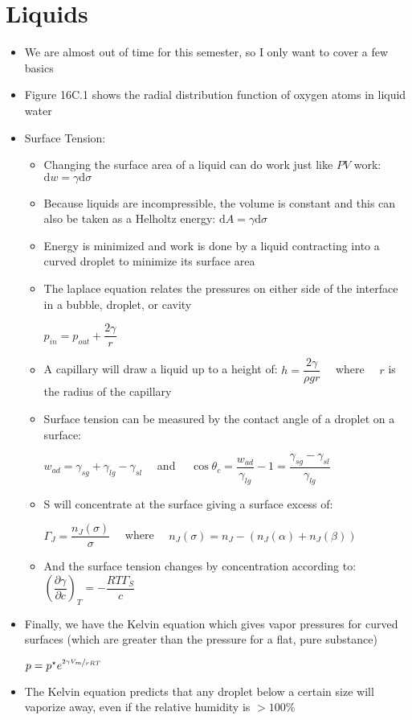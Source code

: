 \documentclass[12pt, openany, letterpaper]{memoir}
\begin{document}
\section{Liquids}
\begin{itemize}
	\item We are almost out of time for this semester, so I only want to cover a few basics
	\item Figure 16C.1 shows the radial distribution function of oxygen atoms in liquid water
	\item Surface Tension:
	\begin{itemize}
		\item Changing the surface area of a liquid can do work just like $PV$ work: $\mathrm{d}w = \gamma\mathrm{d}\sigma$
		\item Because liquids are incompressible, the volume is constant and this can also be taken as a Helholtz energy: $\mathrm{d}A = \gamma\mathrm{d}\sigma$
		\item Energy is minimized and work is done by a liquid contracting into a curved droplet to minimize its surface area
		\item The laplace equation relates the pressures on either side of the interface in a bubble, droplet, or cavity
		
		$p_{in}=p_{out}+\dfrac{2\gamma}{r}$
		\item A capillary will draw a liquid up to a height of: $h=\dfrac{2\gamma}{\rho gr}$ ~~where~~ $r$ is the radius of the capillary
		\item Surface tension can be measured by the contact angle of a droplet on a surface:
		
		$w_{ad}=\gamma_{sg}+\gamma_{lg}-\gamma_{sl}$ ~~and~~ $\cos\theta_c=\dfrac{w_{ad}}{\gamma_{lg}}-1=\dfrac{\gamma_{sg}-\gamma_{sl}}{\gamma_{lg}}$
		\item S will concentrate at the surface giving a surface excess of: 
		
		$\Gamma_J=\dfrac{n_J(\sigma)}{\sigma}$ ~~where~~ $n_J(\sigma) = n_J - \left(n_J(\alpha)+n_J(\beta)\right)$
		\item And the surface tension changes by concentration according to: $\left(\dfrac{\partial\gamma}{\partial c}\right)_T=-\dfrac{RT\Gamma_S}{c}$
	\end{itemize}
	\item Finally, we have the Kelvin equation which gives vapor pressures for curved surfaces (which are greater than the pressure for a flat, pure substance)
	
	$p=p^\star e^{\nicefrac{2\gamma V_m}{rRT}}$
	\item The Kelvin equation predicts that any droplet below a certain size will vaporize away, even if the relative humidity is $>100\%$
\end{itemize}
\end{document}
